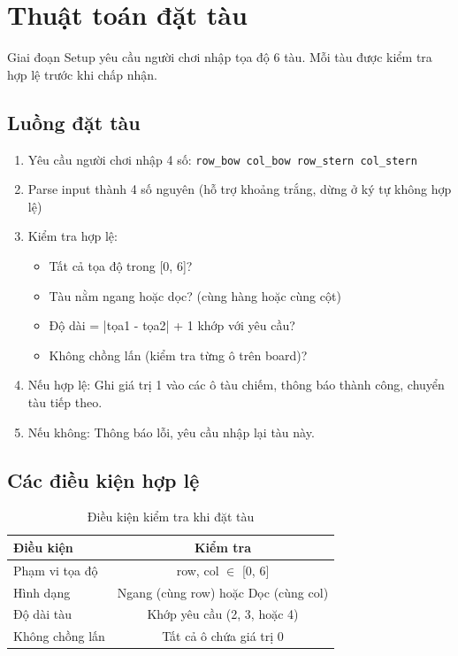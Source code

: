 \section{Thuật toán đặt tàu}

Giai đoạn Setup yêu cầu người chơi nhập tọa độ 6 tàu. Mỗi tàu được kiểm tra hợp lệ trước khi chấp nhận.

\subsection{Luồng đặt tàu}

\begin{enumerate}
    \item Yêu cầu người chơi nhập 4 số: \texttt{row\_bow col\_bow row\_stern col\_stern}
    
    \item Parse input thành 4 số nguyên (hỗ trợ khoảng trắng, dừng ở ký tự không hợp lệ)
    
    \item Kiểm tra hợp lệ:
    \begin{itemize}
        \item Tất cả tọa độ trong [0, 6]?
        \item Tàu nằm ngang hoặc dọc? (cùng hàng hoặc cùng cột)
        \item Độ dài = |tọa1 - tọa2| + 1 khớp với yêu cầu?
        \item Không chồng lấn (kiểm tra từng ô trên board)?
    \end{itemize}
    
    \item Nếu hợp lệ: Ghi giá trị 1 vào các ô tàu chiếm, thông báo thành công, chuyển tàu tiếp theo.
    
    \item Nếu không: Thông báo lỗi, yêu cầu nhập lại tàu này.
\end{enumerate}

\subsection{Các điều kiện hợp lệ}

\begin{table}[H]
\centering
\small
\begin{tabular}{|l|c|}
\hline
\textbf{Điều kiện} & \textbf{Kiểm tra} \\
\hline
Phạm vi tọa độ & row, col $\in$ [0, 6] \\
\hline
Hình dạng & Ngang (cùng row) hoặc Dọc (cùng col) \\
\hline
Độ dài tàu & Khớp yêu cầu (2, 3, hoặc 4) \\
\hline
Không chồng lấn & Tất cả ô chứa giá trị 0 \\
\hline
\end{tabular}
\caption{Điều kiện kiểm tra khi đặt tàu}
\end{table}

